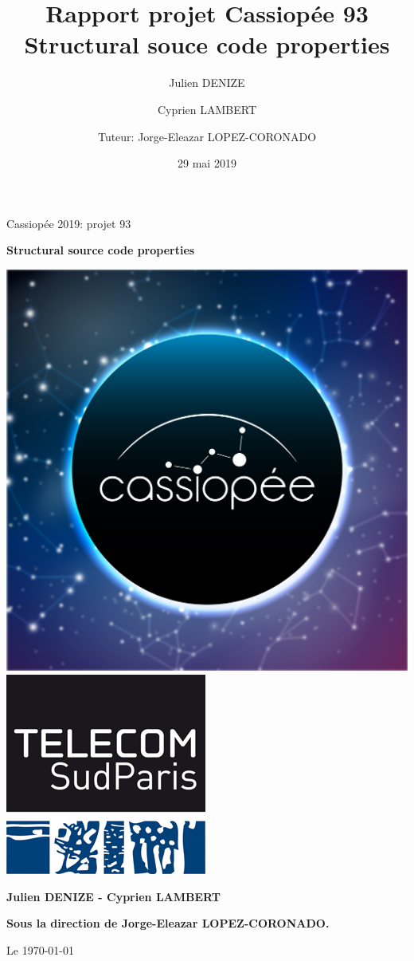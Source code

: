 \documentclass[a4paper, titlepage]{report}
\title{Rapport projet Cassiopée 93\\ \large Structural souce code properties}      %
\author{Julien DENIZE \and Cyprien LAMBERT \\ \and Tuteur: Jorge-Eleazar LOPEZ-CORONADO}           %
\date{29 mai 2019}           %
\begin{document}
\begin{titlepage}
    \parindent=0pt
    Cassiopée 2019: projet 93 
    \begin{center}\bfseries\Huge
        Structural source code properties
    \end{center}
    \vspace*{1cm}
    \begin{center}
        \includegraphics[scale=0.2]{iconcassiopee}
        \includegraphics[scale=0.81]{tsp}
        \end{center}
    \begin{center}\bfseries\Large
    Julien DENIZE - Cyprien LAMBERT
    \end{center}
        
    \begin{center}\bfseries\Large
    Sous la direction de Jorge-Eleazar LOPEZ-CORONADO.
    \end{center}
    \begin{flushright}
            Le \today 
    \end{flushright}
\end{titlepage}
\tableofcontents
\setlength{\parskip}{1em}
\end{document}
